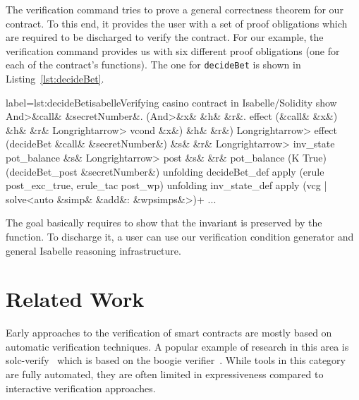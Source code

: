 \documentclass[a4paper,UKenglish,cleveref, autoref, thm-restate]{oasics-v2021}
\begin{document}
The verification command tries to prove a general correctness theorem for our contract.
To this end, it provides the user with a set of proof obligations which are required to be discharged to verify the contract.
For our example, the verification command provides us with six different proof obligations (one for each of the contract's functions).
The one for \texttt{decideBet} is shown in Listing~\ref{lst:decideBet}.
\begin{code}{label={lst:decideBet}}{isabelle}{Verifying casino contract in Isabelle/Solidity
  \hfill{}%
}
  show \<And>&{\color{isarbound}call}& &{\color{isarbound}secretNumber}&. (\<And>&{\color{isarbound}x}& &{\color{isarbound}h}& &{\color{isarbound}r}&. effect (&{\color{isarbound}call}& &{\color{isarbound}x}&) &{\color{isarbound}h}& &{\color{isarbound}r}& \<Longrightarrow> vcond &{\color{isarbound}x}&) &{\color{isarbound}h}& &{\color{isarbound}r}&)
  \<Longrightarrow> effect (decideBet &{\color{isarbound}call}& &{\color{isarbound}secretNumber}&) &{\color{isarfree}s}& &{\color{isarfree}r}&
  \<Longrightarrow> inv_state pot_balance &{\color{isarfree}s}&
  \<Longrightarrow> post &{\color{isarfree}s}& &{\color{isarfree}r}& pot_balance (K True) (decideBet_post &{\color{isarbound}secretNumber}&)
unfolding decideBet_def
apply (erule post_exc_true, erule_tac post_wp)
unfolding  inv_state_def
apply (vcg | solve<auto &{\color{isarpink}simp}& &{\color{isarpink}add}&: &{\color{isarlightgreen}wpsimps}&>)+
...
\end{code}
The goal basically requires to show that the invariant is preserved by the function.
To discharge it, a user can use our verification condition generator and general Isabelle reasoning infrastructure.

\section{Related Work}
Early approaches to the verification of smart contracts are mostly based on automatic verification techniques.
A popular example of research in this area is solc-verify~\cite{hajdu2020solc} which is based on the boogie verifier~\cite{DeLine2005}.
While tools in this category are fully automated, they are often limited in expressiveness compared to interactive verification approaches.
\end{document}
